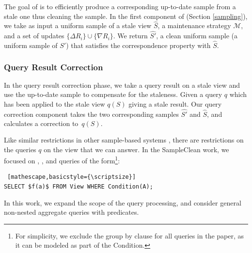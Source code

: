 The goal of \svc is to efficiently produce a corresponding up-to-date sample from a stale one thus cleaning the sample.
In the first component of \svc (Section \ref{sampling}), we take as input a uniform sample of a stale view $\widehat{S}$, a maintenance strategy $\mathcal{M}$, and a set of updates $\{\Delta R_i\} \cup \{\nabla R_i\}$.
We return $\widehat{S'}$, a clean uniform sample (a uniform sample of $S'$) that satisfies the correspondence property with $\widehat{S}$.

\subsubsection{Query Result Correction}
In the query result correction phase, we take a query result on a stale view and use the up-to-date sample to compensate for the staleness.
Given a query $q$ which has been applied to the stale view $q(S)$ giving a stale result.
Our query correction component takes the two corresponding samples $\widehat{S'}$ and $\widehat{S}$, and calculates a correction to~$q(S)$.

Like similar restrictions in other sample-based systems \cite{agarwalknowing}, there are restrictions on the queries $q$ on the view that we can answer. 
In the SampleClean work, we focused on \sumfunc, \countfunc, and \avgfunc queries of the form\footnote{\scriptsize For simplicity, we exclude the group by clause for all queries in the paper, as it can be modeled as part of the \textsf{Condition}.}: 
\begin{lstlisting} [mathescape,basicstyle={\scriptsize}]
SELECT $f(a)$ FROM View WHERE Condition(A);
\end{lstlisting}
In this work, we expand the scope of the query processing, and consider general non-nested aggregate queries with predicates.

